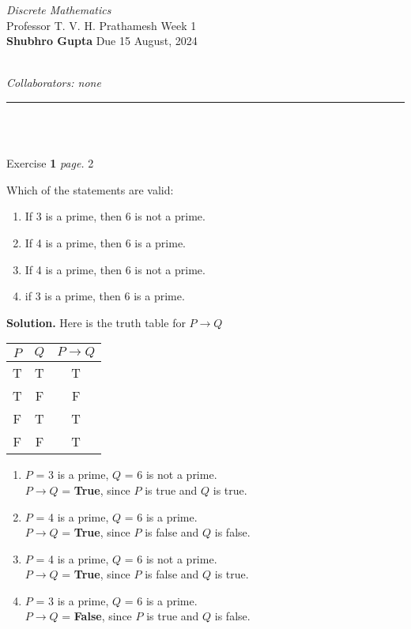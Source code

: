 \documentclass[11pt]{article}
\newcommand{\problem
}[2]{
\begin{mdframed}
    Exercise \textbf{#1} \hfill \emph{page. }#2
\end{mdframed}
}
\newcommand{\heading}[5]{
\begin{large}
\noindent\emph{#1}\smallskip ~\\
Professor #3 \hfill Week #2 \smallskip ~\\
\textbf{Shubhro Gupta} \hfill Due #4 ~\\
\end{large} \medskip ~\\
{\emph{Collaborators: #5}}~\\
\hrule
\vspace{50pt}
~\\
}
\begin{document}
\heading{Discrete Mathematics}{1}{T. V. H. Prathamesh}{15 August, 2024}{none}
\\
\problem{1}{2}
Which of the statements are valid:
\begin{enumerate}
	\item If 3 is a prime, then 6 is not a prime.
	\item If 4 is a prime, then 6 is a prime.
	\item If 4 is a prime, then 6 is not a prime.
	\item if 3 is a prime, then 6 is a prime.
\end{enumerate}
\textbf{Solution. }
Here is the truth table for $P \rightarrow Q$
\begin{center}
	\begin{tabular}{|c|c|c|}
		\hline
		$P$ & $Q$ & $P \rightarrow Q$ \\
		\hline
		T   & T   & T                 \\
		T   & F   & F                 \\
		F   & T   & T                 \\
		F   & F   & T                 \\
		\hline
	\end{tabular}
\end{center}
\vspace{8pt}
\begin{enumerate}
	\item $P$ = 3 is a prime, $Q$ = 6 is not a prime. \\
	      $P \rightarrow Q$ = \textbf{True}, since $P$ is true and $Q$ is true.
	\item $P$ = 4 is a prime, $Q$ = 6 is a prime. \\
	      $P \rightarrow Q$ = \textbf{True}, since $P$ is false and $Q$ is false.
	\item $P$ = 4 is a prime, $Q$ = 6 is not a prime. \\
	      $P \rightarrow Q$ = \textbf{True}, since $P$ is false and $Q$ is true.
	\item $P$ = 3 is a prime, $Q$ = 6 is a prime. \\
	      $P \rightarrow Q$ = \textbf{False}, since $P$ is true and $Q$ is false.
\end{enumerate}
\end{document}
